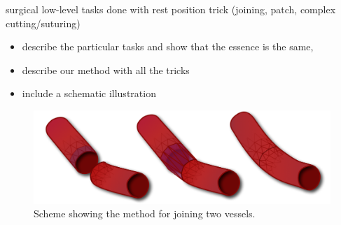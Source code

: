 \noindent surgical low-level tasks done with rest position trick (joining, patch, complex cutting/suturing)
\begin{itemize}
  \item describe the particular tasks and show that the essence is the same,
  \item describe our method with all the tricks
  \item include a schematic illustration
\end{itemize}
\begin{figure}[!h]
\begin{center}
\includegraphics[width=\columnwidth]{img/rest_shape_scheme.png}
\end{center}
\caption{Scheme showing the method for joining two vessels.}
\label{JoiningVessels}
\end{figure}
